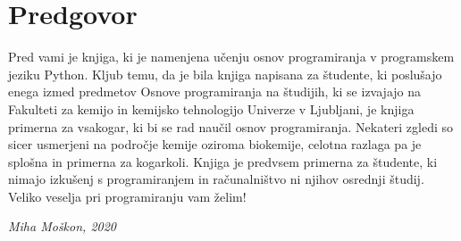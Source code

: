 \chapter*{Predgovor}

Pred vami je knjiga, ki je namenjena učenju osnov programiranja v programskem jeziku Python. Kljub temu, da je bila knjiga napisana za študente, ki poslušajo enega izmed predmetov Osnove programiranja na študijih, ki se izvajajo na Fakulteti za kemijo in kemijsko tehnologijo Univerze v Ljubljani, je knjiga primerna za vsakogar, ki bi se rad naučil osnov programiranja. Nekateri zgledi so sicer usmerjeni na področje kemije oziroma biokemije, celotna razlaga pa je splošna in primerna za kogarkoli. Knjiga je predvsem primerna za študente, ki nimajo izkušenj s programiranjem in računalništvo ni njihov osrednji študij. Veliko veselja pri programiranju vam želim!

\begin{flushright}
\textit{Miha Moškon, 2020}
\end{flushright}
